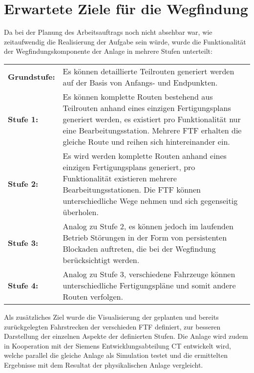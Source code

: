 \section{Erwartete Ziele für die Wegfindung}
	Da bei der Planung des Arbeitsauftrags noch nicht absehbar war, wie zeitaufwendig die Realisierung der Aufgabe sein würde, wurde die Funktionalität der Wegfindungskomponente der Anlage in mehrere Stufen unterteilt:\\
	
	\begin{tabular}{p{2.5cm} p{10cm}}
		\textbf{Grundstufe:} & Es können detaillierte Teilrouten generiert werden auf der Basis von Anfangs- und Endpunkten.\\[0.25cm]
		\textbf{Stufe 1:} & Es können komplette Routen bestehend aus Teilrouten anhand eines einzigen Fertigungsplans generiert werden, es existiert pro Funktionalität nur eine Bearbeitungsstation. Mehrere \ac{FTF} erhalten die gleiche Route und reihen sich hintereinander ein.\\[0.25cm]
		\textbf{Stufe 2:} & Es wird werden komplette Routen anhand eines einzigen Fertigungsplans generiert, pro Funktionalität existieren mehrere Bearbeitungsstationen. Die \ac{FTF} können unterschiedliche Wege nehmen und sich gegenseitig überholen.\\[0.25cm]
		\textbf{Stufe 3:} & Analog zu Stufe 2, es können jedoch im laufenden Betrieb Störungen in der Form von persistenten Blockaden auftreten, die bei der Wegfindung berücksichtigt werden.\\[0.25cm]
		\textbf{Stufe 4:} & Analog zu Stufe 3, verschiedene Fahrzeuge können unterschiedliche Fertigungspläne und somit andere Routen verfolgen.\\[0.25cm]
	\end{tabular}
	
	Als zusätzliches Ziel wurde die Visualisierung der geplanten und bereits zurückgelegten Fahrstrecken der verschieden \ac{FTF} definiert, zur besseren Darstellung der einzelnen Aspekte der definierten Stufen. Die Anlage wird zudem in Kooperation mit der Siemens Entwicklungsabteilung \ac{CT} entwickelt wird, welche parallel die gleiche Anlage als Simulation testet und die ermittelten Ergebnisse mit dem Resultat der physikalischen Anlage vergleicht.
	